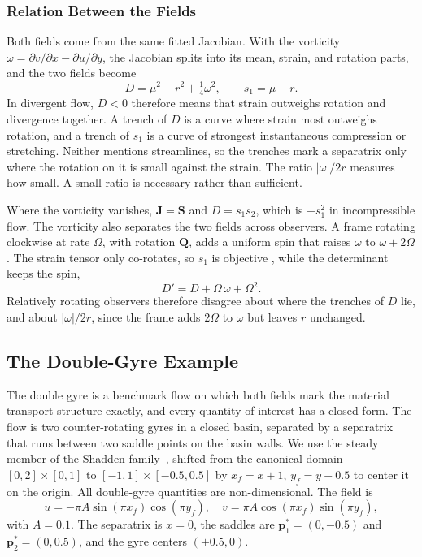 \documentclass[lettersize,journal]{IEEEtran}
\begin{document}
\subsubsection{Relation Between the Fields}
Both fields come from the same fitted Jacobian. With the vorticity
$\omega = \partial v/\partial x - \partial u/\partial y$, the Jacobian
splits into its mean, strain, and rotation parts, and the two fields become
\begin{equation}
    D = \mu^2 - r^2 + \tfrac{1}{4}\omega^2, \qquad s_1 = \mu - r.
    \label{eq:D_parts}
\end{equation}
In divergent flow, $D < 0$ therefore means that strain outweighs rotation
and divergence together. A trench of $D$ is a curve where strain most
outweighs rotation, and a trench of $s_1$ is a curve of strongest
instantaneous compression or stretching. Neither mentions streamlines, so
the trenches mark a separatrix only where the rotation on it is small
against the strain. The ratio $|\omega|/2r$ measures how small. A small
ratio is necessary rather than sufficient.

Where the vorticity vanishes, $\mathbf{J} = \mathbf{S}$ and
$D = s_1 s_2$, which is $-s_1^2$ in incompressible flow. The vorticity
also separates the two fields across observers. A frame rotating clockwise
at rate
$\Omega$, with rotation $\mathbf{Q}$, adds a uniform spin that raises
$\omega$ to $\omega + 2\Omega$. The strain tensor only co-rotates, so
$s_1$ is objective \cite{20}, while the determinant keeps the spin,
\begin{equation}
    D' = D + \Omega\,\omega + \Omega^2 .
    \label{eq:D_not_objective}
\end{equation}
Relatively rotating observers therefore disagree about where the
trenches of $D$ lie, and about $|\omega|/2r$, since the frame adds $2\Omega$
to $\omega$ but leaves $r$ unchanged.

\subsection{The Double-Gyre Example}
\label{sec:dg_example}

The double gyre is
a benchmark flow on which both fields mark the material transport structure
exactly, and every
quantity of interest has a closed form. The flow is two counter-rotating gyres in a
closed basin, separated by a separatrix that runs between two saddle points on
the basin walls. We use the steady member of the Shadden
family~\cite{14}, shifted from the canonical domain
$[0,2]\times[0,1]$ to $[-1,1]\times[-0.5,0.5]$ by $x_f = x + 1$,
$y_f = y + 0.5$ to center it on the origin. All double-gyre quantities are
non-dimensional. The field is
\begin{equation}
u = -\pi A \sin(\pi x_f)\cos(\pi y_f), \quad
v = \pi A \cos(\pi x_f)\sin(\pi y_f),
\label{eq:dg_u}
\end{equation}
with $A = 0.1$. The separatrix is $x = 0$, the saddles are
$\mathbf{p}_1^* = (0, -0.5)$ and $\mathbf{p}_2^* = (0, 0.5)$, and the gyre
centers $(\pm 0.5, 0)$.
\end{document}
